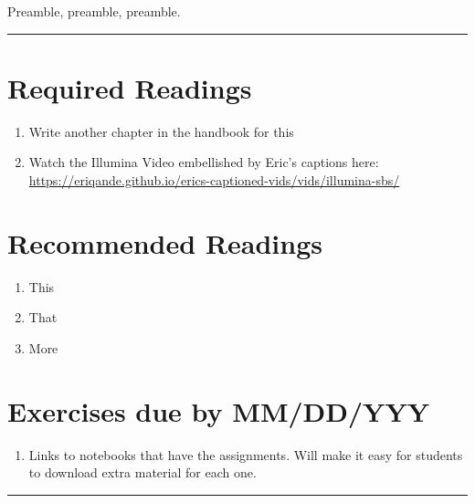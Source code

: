 \documentclass[]{book}
\providecommand{\tightlist}{%
  \setlength{\itemsep}{0pt}\setlength{\parskip}{0pt}}
\begin{document}
Preamble, preamble, preamble.

\begin{center}\rule{0.5\linewidth}{\linethickness}\end{center}

\hypertarget{required-readings-2}{%
\section*{Required Readings}\label{required-readings-2}}

\begin{enumerate}
\def\labelenumi{\arabic{enumi}.}
\tightlist
\item
  Write another chapter in the handbook for this
\item
  Watch the Illumina Video embellished by Eric's captions here:
  \url{https://eriqande.github.io/erics-captioned-vids/vids/illumina-sbs/}
\end{enumerate}

\hypertarget{recommended-readings-2}{%
\section*{Recommended Readings}\label{recommended-readings-2}}

\begin{enumerate}
\def\labelenumi{\arabic{enumi}.}
\tightlist
\item
  This
\item
  That
\item
  More
\end{enumerate}

\hypertarget{exercises-due-by-mmddyyy-2}{%
\section*{Exercises due by MM/DD/YYY}\label{exercises-due-by-mmddyyy-2}}

\begin{enumerate}
\def\labelenumi{\arabic{enumi}.}
\tightlist
\item
  Links to notebooks that have the assignments. Will make it
  easy for students to download extra material for each one.
\end{enumerate}

\begin{center}\rule{0.5\linewidth}{\linethickness}\end{center}
\end{document}
